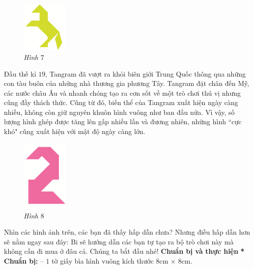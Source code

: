 	\begin{multicols}{2}
		\begin{figure}[H]
			\vspace*{5pt}	
			\captionsetup{labelformat=empty}
			\centering
			\captionsetup{justification=raggedleft}
			\includegraphics[width =0.2\textwidth]{image7}
			\caption{\small\it Hình $7$}
			\vspace*{-10pt}
		\end{figure}
		Đầu thế kỉ $19$, Tangram đã vượt ra khỏi biên giới Trung Quốc thông qua những con tàu buôn của những nhà thương gia phương Tây. \linebreak Tangram đặt chân đến Mỹ, các nước châu Âu và nhanh chóng tạo ra cơn sốt về một trò chơi thú vị nhưng cũng đầy thách thức. Cũng từ đó, biến thể của
		Tangram xuất hiện ngày càng nhiều, không còn giữ nguyên khuôn hình vuông như ban đầu nữa. Vì vậy, số lượng hình ghép được tăng lên gấp nhiều lần và đương nhiên, những hình ``cực khó" cũng xuất hiện với mật độ ngày càng lớn.
		\begin{figure}[H]
			\vspace*{-10pt}	
			\captionsetup{labelformat=empty}
			\centering
			\captionsetup{justification=raggedleft}
			\includegraphics[width =0.2\textwidth]{image8}
			\caption{\small\it Hình $8$}
		\end{figure}
		Nhìn các hình ảnh trên, các bạn đã thấy hấp dẫn chưa? Nhưng điều hấp dẫn hơn sẽ nằm ngay sau đây: Bi sẽ hướng dẫn các bạn tự tạo ra bộ trò chơi này mà không cần đi mua ở đâu cả. Chúng ta bắt đầu nhé!
	\vskip 0.1cm
	\textbf{\color{toancuabi}Chuẩn bị và thực hiện}
	\vskip 0.1cm
	\textbf{\color{toancuabi}* Chuẩn bị:}
	\vskip 0.1cm
	-- $1$ tờ giấy bìa hình vuông kích thước $8$cm $\times$ $8$cm.

\end{multicols}
